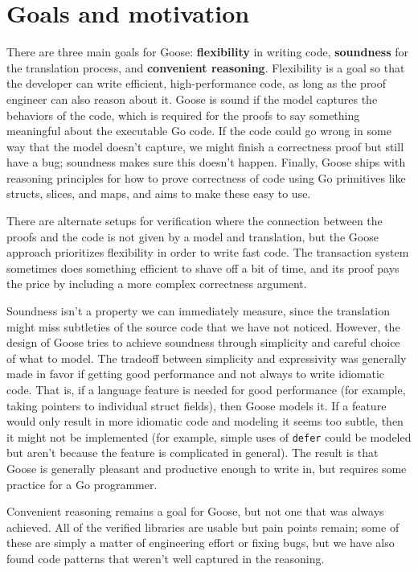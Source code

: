 \section{Goals and motivation}
\label{sec:goose:goals}

There are three main goals for Goose: \textbf{flexibility} in writing code,
\textbf{soundness} for the translation process, and \textbf{convenient
reasoning}. Flexibility is a goal so that the developer can write efficient,
high-performance code, as long as the proof engineer can also reason about it. Goose
is sound if the model captures the behaviors of the code, which is required for
the proofs to say something meaningful about the executable Go code. If the code
could go wrong in some way that the model doesn't capture, we might finish a
correctness proof but still have a bug; soundness makes sure this doesn't
happen. Finally, Goose ships with reasoning principles for how to prove
correctness of code using Go primitives like structs, slices, and maps, and aims
to make these easy to use.

There are alternate setups for verification where the connection between the
proofs and the code is not given by a model and translation, but the Goose
approach prioritizes flexibility in order to write fast code. The transaction
system sometimes does something efficient to shave off a bit of time, and its
proof pays the price by including a more complex correctness argument.

Soundness isn't a property we can immediately measure, since the translation
might miss subtleties of the source code that we have not noticed. However, the
design of Goose tries to achieve soundness through simplicity and careful choice
of what to model. The tradeoff between simplicity and expressivity was generally
made in favor if getting good performance and not always to write idiomatic
code. That is, if a language feature is needed for good performance (for
example, taking pointers to individual struct fields), then Goose models it. If
a feature would only result in more idiomatic code and modeling it seems too
subtle, then it might not be implemented (for example, simple uses of
\texttt{defer} could be modeled but aren't because the feature is complicated in
general). The result is that Goose is generally pleasant and productive enough
to write in, but requires some practice for a Go programmer.

Convenient reasoning remains a goal for Goose, but not one that was always
achieved. All of the verified libraries are usable but pain points remain; some
of these are simply a matter of engineering effort or fixing bugs, but we have
also found code patterns that weren't well captured in the reasoning.

